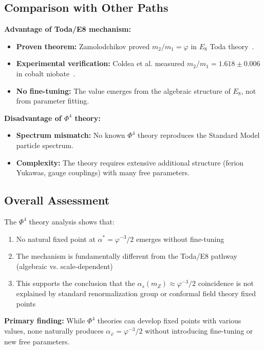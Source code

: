 \documentclass{article}
\begin{document}
\begin{table}[h]
\subsection{Comparison with Other Paths}

\textbf{Advantage of Toda/E8 mechanism:}

\begin{itemize}
  \item \textbf{Proven theorem:} Zamolodchikov proved $m_2/m_1 = \varphi$ in $E_8$ Toda theory~\cite{Zamolodchikov1989}.
  \item \textbf{Experimental verification:} Coldea et al. measured $m_2/m_1 = 1.618 \pm 0.006$ in cobalt niobate~\cite{coldea2010}.
  \item \textbf{No fine-tuning:} The value emerges from the algebraic structure of $E_8$, not from parameter fitting.
\end{itemize}

\textbf{Disadvantage of $\Phi^4$ theory:}

\begin{itemize}
  \item \textbf{Spectrum mismatch:} No known $\Phi^4$ theory reproduces the Standard Model particle spectrum.
  \item \textbf{Complexity:} The theory requires extensive additional structure (ferion Yukawas, gauge couplings) with many free parameters.
\end{itemize}

\subsection{Overall Assessment}

The $\Phi^4$ theory analysis shows that:

\begin{enumerate}
  \item No natural fixed point at $\alpha^* = \varphi^{-3}/2$ emerges without fine-tuning
  \item The mechanism is fundamentally different from the Toda/E8 pathway (algebraic vs. scale-dependent)
  \item This supports the conclusion that the $\alpha_s(m_Z) \approx \varphi^{-3}/2$ coincidence is not explained by standard renormalization group or conformal field theory fixed points
\end{enumerate}

\textbf{Primary finding:} While $\Phi^4$ theories can develop fixed points with various values, none naturally produces $\alpha_\varphi = \varphi^{-3}/2$ without introducing fine-tuning or new free parameters.


\end{table}
\end{document}
